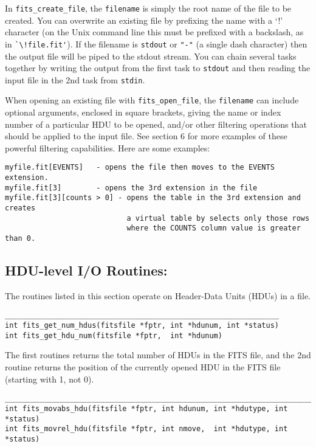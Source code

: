 \documentclass[11pt]{article}
\begin{document}
In {\tt fits\_create\_file},  the {\tt filename} is simply the root name of
the file to be created.  You can overwrite an existing file by
prefixing the name with a `!' character (on the Unix command line this
must be prefixed with a backslash, as in \verb+`\!file.fit'+).  If the
filename is {\tt stdout} or {\tt "-"} (a single dash character)
then the output file will be piped to the stdout stream.  You can
chain several tasks together by writing the output from the first task
to {\tt stdout} and then reading the input file in the 2nd task from
{\tt stdin}.

When opening an existing file with {\tt fits\_open\_file}, the {\tt filename}
can include optional arguments, enclosed in square brackets, giving the
name or index number of a particular HDU to be opened, and/or other
filtering operations that should be applied to the input file.
See section 6 for more examples of these powerful filtering capabilities.
Here are some examples:

\begin{verbatim}
myfile.fit[EVENTS]   - opens the file then moves to the EVENTS extension.
myfile.fit[3]        - opens the 3rd extension in the file
myfile.fit[3][counts > 0] - opens the table in the 3rd extension and creates
                            a virtual table by selects only those rows 
                            where the COUNTS column value is greater than 0.
\end{verbatim}


\subsection{HDU-level I/O Routines:}

The routines listed in this section operate on Header-Data Units (HDUs) in a file.

\begin{verbatim}
_______________________________________________________________
int fits_get_num_hdus(fitsfile *fptr, int *hdunum, int *status)
int fits_get_hdu_num(fitsfile *fptr,  int *hdunum)
\end{verbatim}

The first routines returns the total number of HDUs in the FITS file,
and the 2nd routine returns the position of the currently opened HDU in
the FITS file (starting with 1, not 0).

\begin{verbatim}
__________________________________________________________________________
int fits_movabs_hdu(fitsfile *fptr, int hdunum, int *hdutype, int *status)
int fits_movrel_hdu(fitsfile *fptr, int nmove,  int *hdutype, int *status)
\end{verbatim}
\end{document}
